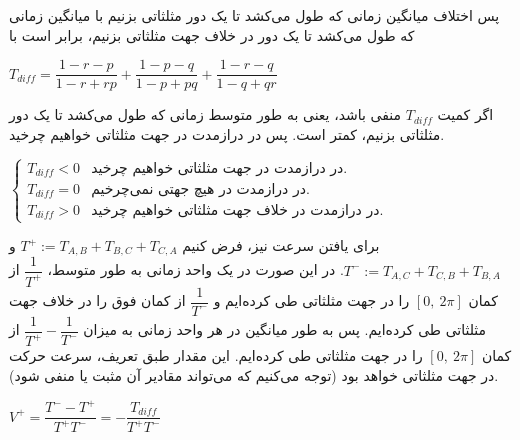 \documentclass{scribe-cgenomics}
\begin{document}
\begin{حل}
پس اختلاف میانگین زمانی که طول می‌کشد تا یک دور مثلثاتی بزنیم با میانگین زمانی که طول می‌کشد تا یک دور در خلاف جهت مثلثاتی بزنیم، برابر است با

\begin{center}
$
T_{diff}=
\dfrac{1-r-p}{1-r+rp} + 
\dfrac{1-p-q}{1-p+pq} +
\dfrac{1-r-q}{1-q+qr}
$
\end{center}

اگر کمیت
$T_{diff}$
منفی باشد، یعنی به طور متوسط زمانی که طول می‌کشد تا یک دور مثلثاتی بزنیم، کمتر است. پس در درازمدت در جهت مثلثاتی خواهیم چرخید.

\begin{center}
$
\begin{cases}
T_{diff} < 0 & \text{در درازمدت در جهت مثلثاتی خواهیم چرخید.}\\
T_{diff} = 0 & \text{در درازمدت در هیچ جهتی نمی‌چرخیم.}\\
T_{diff} > 0 & \text{در درازمدت در خلاف جهت مثلثاتی خواهیم چرخید.}
\end{cases}
$
\end{center}

برای یافتن سرعت نیز، فرض کنیم
$T^+ := T_{A,B} + T_{B,C} + T_{C,A}$
و
$T^- := T_{A,C} + T_{C,B} + T_{B,A}$.
در این صورت در یک واحد زمانی به طور متوسط،
$\dfrac{1}{T^+}$
از کمان
$[0,\ 2\pi]$
را در جهت مثلثاتی طی کرده‌ایم و
$\dfrac{1}{T^-}$
از کمان فوق را در خلاف جهت مثلثاتی طی کرده‌ایم. پس به طور میانگین در هر واحد زمانی به میزان
$\dfrac{1}{T^+} - \dfrac{1}{T^-}$
از کمان
$[0,\ 2\pi]$
را در جهت مثلثاتی طی کرده‌ایم. این مقدار طبق تعریف، سرعت حرکت در جهت مثلثاتی خواهد بود (توجه می‌کنیم که می‌تواند مقادیر آن مثبت یا منفی شود).

\begin{center}
$
V^+ 
=\dfrac{T^- - T^+}{T^+ T^-}
= -\dfrac{T_{diff}}{T^+ T^-}
$
\end{center}

\end{حل}

\newpage
\begin{prob}
\end{prob}
\end{document}
